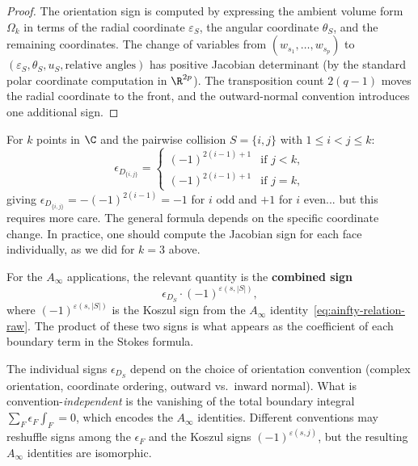 \begin{proof}
The orientation sign is computed by expressing the ambient volume form $\Omega_k$ in terms of the radial coordinate $\varepsilon_S$, the angular coordinate $\theta_S$, and the remaining coordinates. The change of variables from $(w_{s_1},\ldots,w_{s_p})$ to $(\varepsilon_S,\theta_S, u_S, \text{relative angles})$ has positive Jacobian determinant (by the standard polar coordinate computation in $\R^{2p}$). The transposition count $2(q-1)$ moves the radial coordinate to the front, and the outward-normal convention introduces one additional sign.
\end{proof}

\begin{corollary}
For $k$ points in $\C$ and the pairwise collision $S = \{i,j\}$ with $1\le i < j \le k$:
\begin{equation}
\label{eq:pairwise-eps}
\epsilon_{D_{\{i,j\}}} = \begin{cases}
(-1)^{2(i-1)+1} & \text{if } j < k,\\
(-1)^{2(i-1)+1} & \text{if } j = k,
\end{cases}
\end{equation}
giving $\epsilon_{D_{\{i,j\}}} = -(-1)^{2(i-1)} = -1$ for $i$ odd and $+1$ for $i$ even... but this requires more care. The general formula depends on the specific coordinate change. In practice, one should compute the Jacobian sign for each face individually, as we did for $k=3$ above.

For the $A_\infty$ applications, the relevant quantity is the \textbf{combined sign}
\[
\epsilon_{D_S}\cdot(-1)^{\varepsilon(s,|S|)},
\]
where $(-1)^{\varepsilon(s,|S|)}$ is the Koszul sign from the $A_\infty$ identity~\eqref{eq:ainfty-relation-raw}. The product of these two signs is what appears as the coefficient of each boundary term in the Stokes formula.
\end{corollary}

\begin{remark}
The individual signs $\epsilon_{D_S}$ depend on the choice of orientation convention (complex orientation, coordinate ordering, outward vs.\ inward normal). What is convention-\emph{independent} is the vanishing of the total boundary integral $\sum_F \epsilon_F\int_F = 0$, which encodes the $A_\infty$ identities. Different conventions may reshuffle signs among the $\epsilon_F$ and the Koszul signs $(-1)^{\varepsilon(s,j)}$, but the resulting $A_\infty$ identities are isomorphic.
\end{remark}

